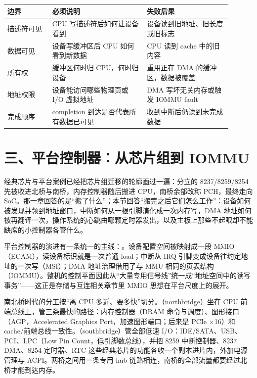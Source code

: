 \begin{longtable}{L{0.18\linewidth}L{0.38\linewidth}L{0.34\linewidth}}
\toprule
边界 & 必须说明 & 失败后果 \\
\midrule
描述符可见 & CPU 写描述符后如何让设备看到 & 设备读到旧地址、旧长度或旧标志 \\\tablerowrule
数据可见 & 设备写缓冲区后 CPU 如何看到新数据 & CPU 读到 cache 中的旧内容 \\\tablerowrule
所有权 & 缓冲区何时归 CPU，何时归设备 & 重用正在 DMA 的缓冲区，数据被覆盖 \\\tablerowrule
地址权限 & 设备能访问哪些物理页或 I/O 虚拟地址 & DMA 写坏无关内存或触发 IOMMU fault \\\tablerowrule
完成顺序 & completion 到达是否代表所有数据已可见 & 收到中断后仍读到未完成数据 \\
\bottomrule
\end{longtable}

\section{三、平台控制器：从芯片组到 IOMMU}

经典芯片与平台案例已经把芯片组迁移的轮廓画过一遍：分立的 8237/8259/8254 先被收进北桥与南桥，内存控制器随后搬进 CPU，南桥余部改称 PCH，最终走向 SoC。那一章回答的是“搬了什么”；本节回答“搬完之后它们怎么工作”：设备如何被发现并领到地址窗口，中断如何从一根引脚演化成一次内存写，DMA 地址如何被再翻译一次，操作系统的心跳由哪颗定时器发出，以及主板上那些不起眼却不能缺席的小控制器各管什么。

\begin{keyidea}
平台控制器的演进有一条统一的主线：。设备配置空间被映射成一段 MMIO（ECAM），读设备标识就是一次普通 load；中断从 IRQ 引脚变成设备往约定地址的一次写（MSI）；DMA 地址治理借用了与 MMU 相同的页表结构（IOMMU）。整机的控制平面因此从“大量专用信号线”统一成“地址空间中的读写事务”——这正是存储与互连相关章节里 MMIO 思想在平台尺度上的展开。
\end{keyidea}


南北桥时代的分工按“离 CPU 多近、要多快”切分。（northbridge）坐在 CPU 前端总线上，管三条最快的路径：内存控制器（DRAM 命令与调度）、图形接口（AGP，Accelerated Graphics Port，加速图形端口；后来是 PCIe $\times$16）和 cache/前端总线一致性。（southbridge）管全部低速 I/O：IDE/SATA、USB、PCI、LPC（Low Pin Count，低引脚数总线），并把 8259 中断控制器、8237 DMA、8254 定时器、RTC 这些经典芯片的功能各收一个副本进片内，外加电源管理与 ACPI。两桥之间用一条专用 hub 链路相连，南桥的全部流量都要经过北桥才能到达内存。

